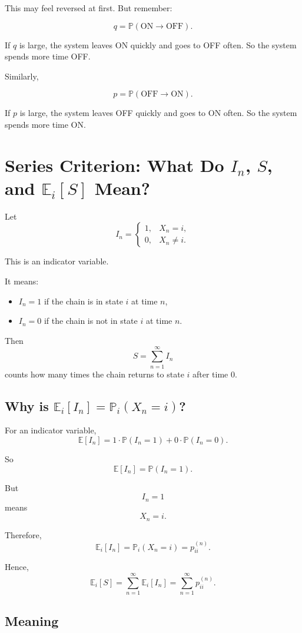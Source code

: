 \documentclass[12pt,a4paper]{article}
\theoremstyle{notestyle}
\newcommand{\Prob}{\mathbb{P}}
\newcommand{\E}{\mathbb{E}}
\begin{document}
This may feel reversed at first. But remember:

\[
q=\Prob(\text{ON}\to \text{OFF}).
\]

If $q$ is large, the system leaves ON quickly and goes to OFF often. So the system spends more time OFF.

Similarly,

\[
p=\Prob(\text{OFF}\to \text{ON}).
\]

If $p$ is large, the system leaves OFF quickly and goes to ON often. So the system spends more time ON.

\section{Series Criterion: What Do $I_n$, $S$, and $\E_i[S]$ Mean?}

Let
\[
I_n=
\begin{cases}
1, & X_n=i,\\
0, & X_n\neq i.
\end{cases}
\]

This is an indicator variable.

It means:
\begin{itemize}[leftmargin=1.2cm]
    \item $I_n=1$ if the chain is in state $i$ at time $n$,
    \item $I_n=0$ if the chain is not in state $i$ at time $n$.
\end{itemize}

Then
\[
S=\sum_{n=1}^{\infty}I_n
\]
counts how many times the chain returns to state $i$ after time 0.

\subsection*{Why is $\E_i[I_n]=\Prob_i(X_n=i)$?}

For an indicator variable,
\[
\E[I_n]=1\cdot \Prob(I_n=1)+0\cdot \Prob(I_n=0).
\]

So
\[
\E[I_n]=\Prob(I_n=1).
\]

But
\[
I_n=1
\]
means
\[
X_n=i.
\]

Therefore,
\[
\E_i[I_n]=\Prob_i(X_n=i)=p_{ii}^{(n)}.
\]

Hence,
\[
\E_i[S]
=
\sum_{n=1}^{\infty}\E_i[I_n]
=
\sum_{n=1}^{\infty}p_{ii}^{(n)}.
\]

\subsection*{Meaning}
\end{document}
